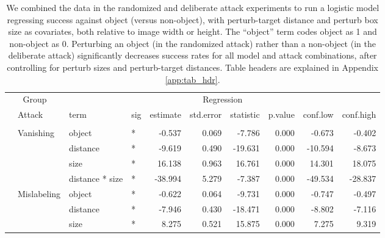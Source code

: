 \begingroup\fontsize{9}{11}\selectfont

\begin{longtable}[t]{llllrrrrrr}
\caption{\label{tab:rand_arb_compare_table}We combined the data in the randomized and deliberate attack experiments to run a logistic model regressing success against object (versus non-object), with perturb-target distance and perturb box size as covariates, both relative to image width or height. The ``object'' term codes object as 1 and non-object as 0. Perturbing an object (in the randomized attack) rather than a non-object (in the deliberate attack) significantly decreases success rates for all model and attack combinations, after controlling for perturb sizes and perturb-target distances. Table headers are explained in Appendix \ref{app:tab_hdr}.}\\
\toprule
\multicolumn{2}{c}{Group} & \multicolumn{8}{c}{Regression} \\
\cmidrule(l{3pt}r{3pt}){1-2} \cmidrule(l{3pt}r{3pt}){3-10}
 & Attack & term & sig & estimate & std.error & statistic & p.value & conf.low & conf.high\\
\midrule
\addlinespace[0.3em]
\multicolumn{10}{l}{\textbf{YOLOv3}}\\
\hspace{1em} & Vanishing & object & * & -0.537 & 0.069 & -7.786 & 0.000 & -0.673 & -0.402\\
\cmidrule{3-10}\nopagebreak
\hspace{1em} &  & distance & * & -9.619 & 0.490 & -19.631 & 0.000 & -10.594 & -8.673\\
\cmidrule{3-10}\nopagebreak
\hspace{1em} &  & size & * & 16.138 & 0.963 & 16.761 & 0.000 & 14.301 & 18.075\\
\cmidrule{3-10}\nopagebreak
\hspace{1em} &  & distance * size & * & -38.994 & 5.279 & -7.387 & 0.000 & -49.534 & -28.837\\
\cmidrule{2-10}\nopagebreak
\hspace{1em} & Mislabeling & object & * & -0.622 & 0.064 & -9.731 & 0.000 & -0.747 & -0.497\\
\cmidrule{3-10}\nopagebreak
\hspace{1em} &  & distance & * & -7.946 & 0.430 & -18.471 & 0.000 & -8.802 & -7.116\\
\cmidrule{3-10}\nopagebreak
\hspace{1em} &  & size & * & 8.275 & 0.521 & 15.875 & 0.000 & 7.275 & 9.319\\

\end{longtable}
